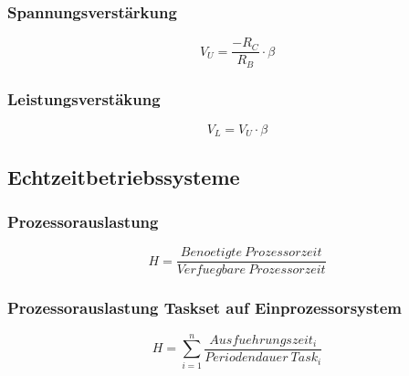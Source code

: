 \subsubsection{Spannungsverstärkung}
\[V_U = \frac{-R_C}{R_B} \cdot \beta\]

\subsubsection{Leistungsverstäkung}
\[V_L = V_U \cdot \beta\]


\subsection{Echtzeitbetriebssysteme}

\subsubsection{Prozessorauslastung}
\[H = \frac{Benoetigte~Prozessorzeit}{Verfuegbare~Prozessorzeit}\]

\subsubsection{Prozessorauslastung Taskset auf Einprozessorsystem}
\[H = \sum_{i=1}^{n}\frac{Ausfuehrungszeit_i}{Periodendauer~Task_i}\]
